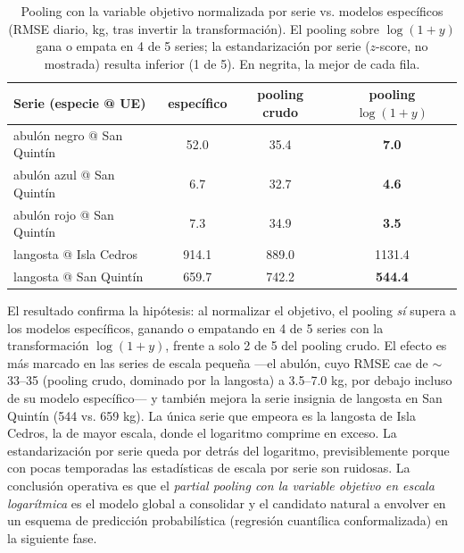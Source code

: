\documentclass[twoside,11pt]{article}
\begin{document}
\begin{table}[htbp]
\centering
\small
\begin{tabular}{lccc}
\toprule
Serie (especie @ UE) & específico & pooling crudo & pooling $\log(1{+}y)$ \\
\midrule
abulón negro @ San Quintín & 52.0 & 35.4 & \textbf{7.0} \\
abulón azul @ San Quintín & 6.7 & 32.7 & \textbf{4.6} \\
abulón rojo @ San Quintín & 7.3 & 34.9 & \textbf{3.5} \\
langosta @ Isla Cedros & 914.1 & 889.0 & 1131.4 \\
langosta @ San Quintín & 659.7 & 742.2 & \textbf{544.4} \\
\bottomrule
\end{tabular}
\caption{Pooling con la variable objetivo normalizada por serie vs. modelos específicos (RMSE diario, kg, tras invertir la transformación). El pooling sobre $\log(1+y)$ gana o empata en 4 de 5 series; la estandarización por serie ($z$-score, no mostrada) resulta inferior (1 de 5). En negrita, la mejor de cada fila.}
\label{tab:extension_ynorm}
\end{table}

El resultado confirma la hipótesis: al normalizar el objetivo, el pooling \emph{sí} supera a los modelos específicos, ganando o empatando en 4 de 5 series con la transformación $\log(1+y)$, frente a solo 2 de 5 del pooling crudo. El efecto es más marcado en las series de escala pequeña —el abulón, cuyo RMSE cae de $\sim$33--35 (pooling crudo, dominado por la langosta) a 3.5--7.0 kg, por debajo incluso de su modelo específico— y también mejora la serie insignia de langosta en San Quintín (544 vs. 659 kg). La única serie que empeora es la langosta de Isla Cedros, la de mayor escala, donde el logaritmo comprime en exceso. La estandarización por serie queda por detrás del logaritmo, previsiblemente porque con pocas temporadas las estadísticas de escala por serie son ruidosas. La conclusión operativa es que el \emph{partial pooling con la variable objetivo en escala logarítmica} es el modelo global a consolidar y el candidato natural a envolver en un esquema de predicción probabilística (regresión cuantílica conformalizada) en la siguiente fase.
\end{document}
